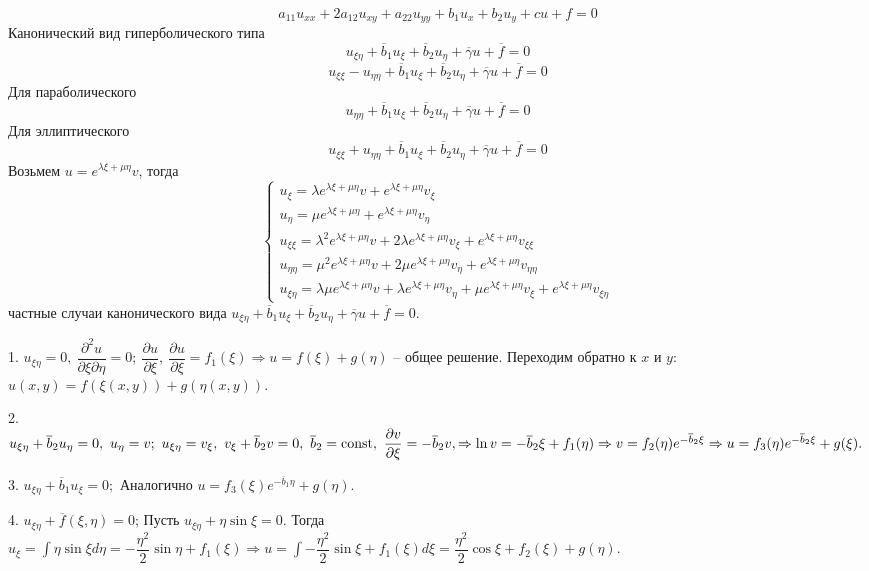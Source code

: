 \documentclass[9pt]{article}
\begin{document}
\ 
\begin{equation}
a_{11}u_{xx}+2a_{12}u_{xy}+a_{22}u_{yy}+b_1u_x+b_2u_y+cu+f=0
\end{equation}
Канонический вид гиперболического типа
\[u_{\xi\eta}+\overline b_1u_\xi+\overline b_2u_\eta+\overline\gamma u+\overline f=0\]
\[u_{\xi\xi}-u_{\eta\eta}+\overline b_1u_\xi+\overline b_2u_\eta+\overline\gamma u+\overline f=0\]
Для параболического
\[u_{\eta\eta}+\overline b_1u_\xi+\overline b_2u_\eta+\overline\gamma u+\overline f=0\]
Для эллиптического
\[u_{\xi\xi}+u_{\eta\eta}+\overline b_1u_\xi+\overline b_2u_\eta+\overline\gamma u+\overline f=0\]
Возьмем \(u=e^{\lambda\xi+\mu\eta}v\), тогда 
\[\left\{
\begin{array}{l}
    u_\xi=\lambda e^{\lambda\xi+\mu\eta}v+e^{\lambda\xi+\mu\eta}v_\xi \\
    u_\eta=\mu e^{\lambda\xi+\mu\eta}+e^{\lambda\xi+\mu\eta}v_\eta \\
    u_{\xi\xi}=\lambda^2e^{\lambda\xi+\mu\eta}v+2\lambda e^{\lambda\xi+\mu\eta}v_\xi+e^{\lambda\xi+\mu\eta}v_{\xi\xi}\\
    u_{\eta\eta}=\mu^2e^{\lambda\xi+\mu\eta}v+2\mu e^{\lambda\xi+\mu\eta}v_\eta+e^{\lambda\xi+\mu\eta}v_{\eta\eta}\\
    u_{\xi\eta}=\lambda\mu e^{\lambda\xi+\mu\eta}v+\lambda e^{\lambda\xi+\mu\eta}v_\eta+\mu e^{\lambda\xi+\mu\eta}v_\xi+e^{\lambda\xi+\mu\eta}v_{\xi\eta}
\end{array}
\right.\]
 частные случаи канонического вида \(u_{\xi\eta}+\overline b_1u_\xi+\overline b_2u_\eta+\overline\gamma u+\overline f=0\).
\par1. \(u_{\xi\eta}=0,\ \dfrac{\partial^2u}{\partial\xi\partial\eta}=0;\ \dfrac{\partial u}{\partial \xi},\ \dfrac{\partial u}{\partial \xi}=f_1(\xi)\Rightarrow u=f(\xi)+g(\eta)\) -- общее решение. Переходим обратно к \(x\) и \(y\): \(u(x,y)=f(\xi(x,y))+g(\eta(x,y)).\)
\par2. \(u_{\xi\eta}+\overline b_2u_\eta=0,\ u_\eta=v;\ u_{\xi\eta}=v_\xi,\ v_\xi+\overline b_2 v=0,\ \overline b_2=\const,\ \dfrac{\partial v}{\partial \xi}=-\overline b_2v,\Rightarrow \ln v=-\overline b_2\xi+f_1(\eta)\Rightarrow v=f_2(\eta)e^{-\overline b_2\xi}\Rightarrow u=f_3(\eta)e^{-\overline b_2\xi}+g(\xi).\)
\par3. \(u_{\xi\eta}+\overline b_1u_\xi=0;\) Аналогично \(u=f_3(\xi)e^{-\overline b_1\eta}+g(\eta).\)
\par4. \(u_{\xi\eta}+\overline f(\xi,\eta)=0\); Пусть \(u_{\xi\eta}+\eta\sin\xi=0\). Тогда \(u_\xi=\int\eta\sin\xi d\eta=-\dfrac{\eta^2}{2}\sin\eta+f_1(\xi)\Rightarrow u=\int-\dfrac{\eta^2}{2}\sin\xi+f_1(\xi)d\xi=\dfrac{\eta^2}{2}\cos\xi+f_2(\xi)+g(\eta).\)
\end{document}
